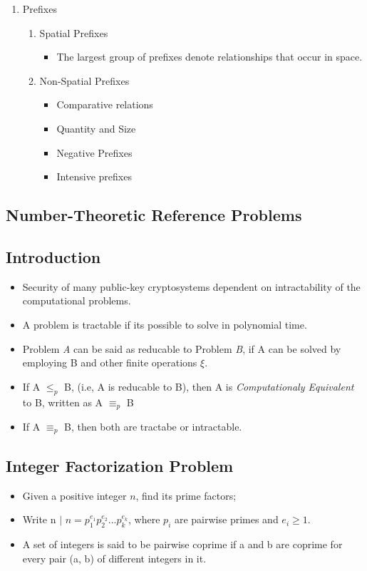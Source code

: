 \documentclass[12pt]{article}
\begin{document}
\begin{enumerate}
\item Prefixes
\begin{enumerate} 
\item Spatial Prefixes
\begin{itemize}
\item The largest group of prefixes denote relationships that occur in space.
\end{itemize}
\item Non-Spatial Prefixes
\begin{itemize}
\item Comparative relations
\item Quantity and Size
\item Negative Prefixes
\item Intensive prefixes
\end{itemize}
\end{enumerate}
\end{enumerate}



\pagebreak
\vspace*{\fill}
\begin{center}
\section{Number-Theoretic Reference Problems}
\end{center}
\vspace*{\fill}
\pagebreak
\subsection{Introduction}
\begin{itemize}
\item Security of many public-key cryptosystems dependent on intractability of the computational problems.
\item A problem is tractable if its possible to solve in polynomial time.
\item Problem \textit{A} can be said as reducable to Problem \textit{B}, if A can be solved by employing B and other finite operations $\xi.$
\item If A $\leq_{p}$ B, (i.e, A is reducable to B), then A is \textit{Computationaly Equivalent} to B, written as A $\equiv_{p}$ B
\item If  A $\equiv_{p}$ B, then both are tractabe or intractable.
\end{itemize} 

\subsection{Integer Factorization Problem}
\begin{itemize}
\item Given a positive integer $\textit{n}$, find its prime factors;
\item Write n $\mid$ $n = p_{1}^{e_{1}}p_{2}^{e_{2}}...p_{k}^{e_{k}}$, where $p_{i}$ are pairwise primes and $e_{i} \geq 1.$
\item  A set of integers is said to be pairwise coprime if a and b are coprime for every pair (a, b) of different integers in it.
\end{itemize}
\end{document}
